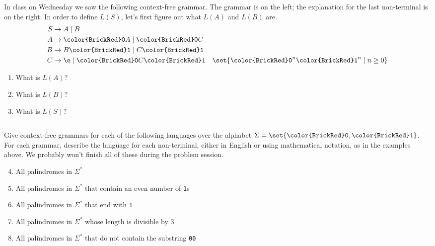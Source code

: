 \documentclass[11pt]{article}
\def\Sym#1{\texttt{\color{BrickRed}#1}}
\begin{document}

\noindent
In class on Wednesday we saw the following context-free grammar. The grammar is
on the left; the explanation for the last non-terminal is on the right. In order to define
$L(S)$, let's first figure out what $L(A)$ and $L(B)$ are.
\begin{align*}
	S & \to A \mid B
		&& 
	\\
	A & \to \Sym0 A \mid \Sym0 C
		&&
	\\
	B & \to B \Sym1 \mid C \Sym1
		&&
	\\
	C & \to \e \mid \Sym0 C \Sym1
		&& \set{\Sym0^n\Sym1^n\mid n\ge 0}
\end{align*}

\bigskip

\begin{enumerate}
\itemsep 4ex
	\item What is $L(A)$?
	\item What is $L(B)$?
	\item What is $L(S)$?
\end{enumerate}

\hrule
\bigskip

\noindent
Give context-free grammars for each of the following languages over the alphabet
$\Sigma = \set{\Sym0,\Sym1}$.  For each grammar, describe the language for each
non-terminal, either in English or using mathematical notation,  as in the
examples above.  We probably won't finish all of these during the problem session.


\begin{enumerate}
	\setcounter{enumi}{3}
\itemsep 4ex

\item
All palindromes in $\Sigma^*$

\item
All palindromes in $\Sigma^*$ that contain an even number of \Sym1s

\item
All palindromes in $\Sigma^*$ that end with \Sym1

\item
All palindromes in $\Sigma^*$ whose length is divisible by $3$

\item
All palindromes in $\Sigma^*$ that do not contain the substring \Sym{00}

\end{enumerate}
\end{document}
